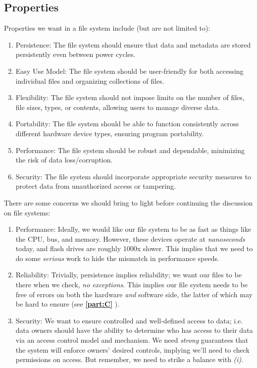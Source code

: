 \documentclass{report}
\newcommand{\asideBegin}[1]{\begin{tcolorbox}[colback=orange!5!white,colframe=black!75!orange,title={Aside:
      #1}]}
\newcommand{\asideEnd}{\end{tcolorbox}}
\newcommand{\refto}[2]{\textbf{\ref{#1:#2} \nameref{#1:#2}}}
\begin{document}
\subsection{Properties}
Properties we want in a file system include (but are not limited to):

\begin{enumerate}[label=\textit{(\roman*)}]
\item Persistence: The file system should ensure that data and metadata are stored persistently even
  between power cycles.
\item Easy Use Model: The file system should be user-friendly for both accessing individual files
  and organizing collections of files.
\item Flexibility: The file system should not impose limits on the number of files, file sizes,
  types, or contents, allowing users to manage diverse data.
\item Portability: The file system should be able to function consistently across different hardware
  device types, ensuring program portability.
\item Performance: The file system should be robust and dependable, minimizing the risk of data loss/corruption.
\item Security: The file system should incorporate appropriate security measures to protect data
  from unauthorized access or tampering.
\end{enumerate}

\asideBegin{Issues}
There are some concerns we should bring to light before continuing the discussion on file systems:

\begin{enumerate}[label=\textit{(\roman*)}]
\item Performance: Ideally, we would like our file system to be as fast as things like the CPU, bus,
  and memory. However, these devices operate at \textit{nanoseconds} today, and flash drives are
  roughly 1000x slower. This implies that we need to do some \textit{serious} work to hide the
  mismatch in performance speeds.
\item Reliability: Trivially, persistence implies reliability; we want our files to be there when we
  check, \textit{no exceptions}. This implies our file system needs to be free of errors on both the
  hardware \textit{and} software side, the latter of which may be hard to ensure (see
  \refto{part}{C}).
\item Security: We want to ensure controlled and well-defined access to data; i.e. data owners
  should have the ability to determine who has access to their data via an access control model and
  mechanism. We need \textit{strong} guarantees that the system will enforce owners' desired
  controls, implying we'll need to check permissions on access. But remember, we need to strike a
  balance with \textit{(i)}. 
\end{enumerate}
\asideEnd
\end{document}
